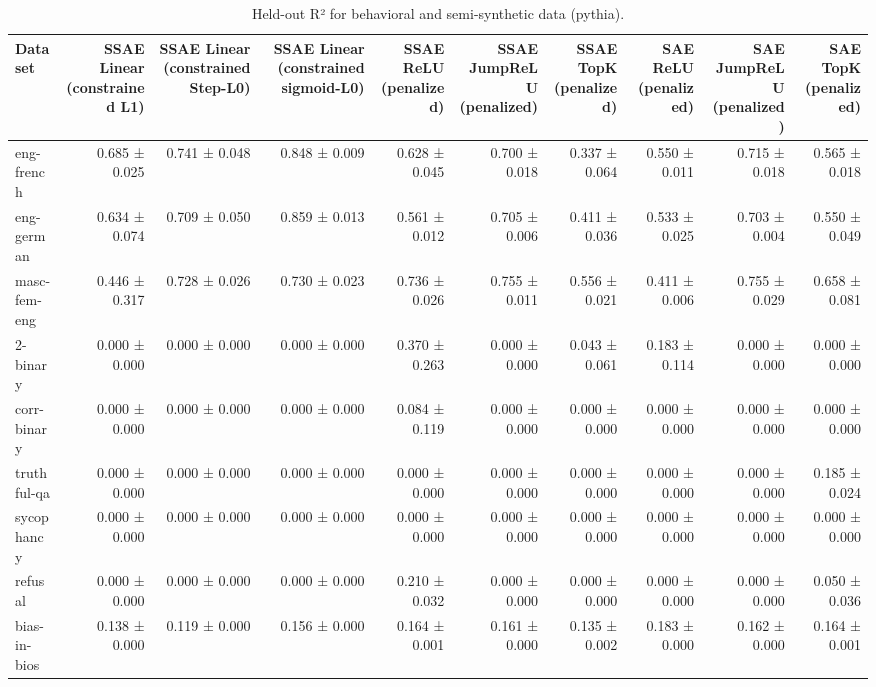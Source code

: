 \begin{table}[t]
\centering
\caption{Held-out R² for behavioral and semi-synthetic data (pythia).}
\label{tab:all-datasets-pythia-r2}
\begin{tabular}{lrrrrrrrrr}
\toprule
Dataset & SSAE Linear (constrained L1) & SSAE Linear (constrained Step-L0) & SSAE Linear (constrained sigmoid-L0) & SSAE ReLU (penalized) & SSAE JumpReLU (penalized) & SSAE TopK (penalized) & SAE ReLU (penalized) & SAE JumpReLU (penalized) & SAE TopK (penalized) \\
\midrule
eng-french & 0.685 ± 0.025 & 0.741 ± 0.048 & 0.848 ± 0.009 & 0.628 ± 0.045 & 0.700 ± 0.018 & 0.337 ± 0.064 & 0.550 ± 0.011 & 0.715 ± 0.018 & 0.565 ± 0.018 \\
eng-german & 0.634 ± 0.074 & 0.709 ± 0.050 & 0.859 ± 0.013 & 0.561 ± 0.012 & 0.705 ± 0.006 & 0.411 ± 0.036 & 0.533 ± 0.025 & 0.703 ± 0.004 & 0.550 ± 0.049 \\
masc-fem-eng & 0.446 ± 0.317 & 0.728 ± 0.026 & 0.730 ± 0.023 & 0.736 ± 0.026 & 0.755 ± 0.011 & 0.556 ± 0.021 & 0.411 ± 0.006 & 0.755 ± 0.029 & 0.658 ± 0.081 \\
2-binary & 0.000 ± 0.000 & 0.000 ± 0.000 & 0.000 ± 0.000 & 0.370 ± 0.263 & 0.000 ± 0.000 & 0.043 ± 0.061 & 0.183 ± 0.114 & 0.000 ± 0.000 & 0.000 ± 0.000 \\
corr-binary & 0.000 ± 0.000 & 0.000 ± 0.000 & 0.000 ± 0.000 & 0.084 ± 0.119 & 0.000 ± 0.000 & 0.000 ± 0.000 & 0.000 ± 0.000 & 0.000 ± 0.000 & 0.000 ± 0.000 \\
truthful-qa & 0.000 ± 0.000 & 0.000 ± 0.000 & 0.000 ± 0.000 & 0.000 ± 0.000 & 0.000 ± 0.000 & 0.000 ± 0.000 & 0.000 ± 0.000 & 0.000 ± 0.000 & 0.185 ± 0.024 \\
sycophancy & 0.000 ± 0.000 & 0.000 ± 0.000 & 0.000 ± 0.000 & 0.000 ± 0.000 & 0.000 ± 0.000 & 0.000 ± 0.000 & 0.000 ± 0.000 & 0.000 ± 0.000 & 0.000 ± 0.000 \\
refusal & 0.000 ± 0.000 & 0.000 ± 0.000 & 0.000 ± 0.000 & 0.210 ± 0.032 & 0.000 ± 0.000 & 0.000 ± 0.000 & 0.000 ± 0.000 & 0.000 ± 0.000 & 0.050 ± 0.036 \\
bias-in-bios & 0.138 ± 0.000 & 0.119 ± 0.000 & 0.156 ± 0.000 & 0.164 ± 0.001 & 0.161 ± 0.000 & 0.135 ± 0.002 & 0.183 ± 0.000 & 0.162 ± 0.000 & 0.164 ± 0.001 \\
\bottomrule
\end{tabular}
\end{table}
